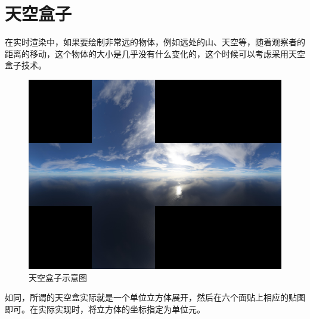    \section{天空盒子}
            \begin{spacing}{2.5}
            	     在实时渲染中，如果要绘制非常远的物体，例如远处的山、天空等，随着观察者的距离的移动，这个物体的大小是几乎没有什么变化的，这个时候可以考虑采用天空盒子技术。
            \end{spacing}


     \begin{figure}[H]
    	\centering
		\includegraphics[width=1.0\textwidth]{images/skybox.jpeg}
		\caption{天空盒子示意图}
		\label{skybox}
    \end{figure}
                \begin{spacing}{2.5}
                	    如同，所谓的天空盒实际就是一个单位立方体展开，然后在六个面贴上相应的贴图即可。在实际实现时，将立方体的坐标指定为单位元。
                \end{spacing}


    
    

